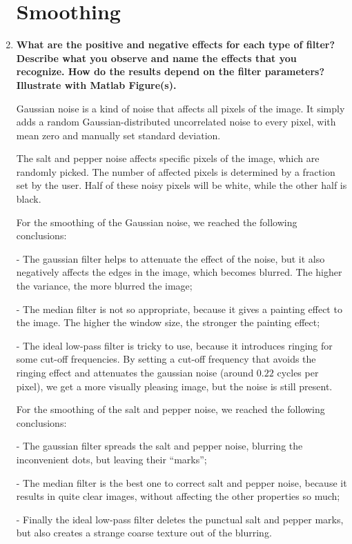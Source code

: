 \documentclass{article}
\begin{document}
\begin{enumerate}
\section{Smoothing}

\item \textbf{What are the positive and negative effects for each type of filter? Describe what you observe and name the effects that you recognize. How do the results depend on the filter parameters? Illustrate with Matlab Figure(s).}

Gaussian noise is a kind of noise that affects all pixels of the image. It simply adds a random Gaussian-distributed uncorrelated noise to every pixel, with mean zero and manually set standard deviation.

The salt and pepper noise affects specific pixels of the image, which are randomly picked. The number of affected pixels is determined by a fraction set by the user. Half of these noisy pixels will be white, while the other half is black.

For the smoothing of the Gaussian noise, we reached the following conclusions:

- The gaussian filter helps to attenuate the effect of the noise, but it also negatively affects the edges in the image, which becomes blurred. The higher the variance, the more blurred the image;

- The median filter is not so appropriate, because it gives a painting effect to the image. The higher the window size, the stronger the painting effect;

- The ideal low-pass filter is tricky to use, because it introduces ringing for some cut-off frequencies. By setting a cut-off frequency that avoids the ringing effect and attenuates the gaussian noise (around $0.22$ cycles per pixel), we get a more visually pleasing image, but the noise is still present.

For the smoothing of the salt and pepper noise, we reached the following conclusions:

- The gaussian filter spreads the salt and pepper noise, blurring the inconvenient dots, but leaving their ``marks'';

- The median filter is the best one to correct salt and pepper noise, because it results in quite clear images, without affecting the other properties so much;

- Finally the ideal low-pass filter deletes the punctual salt and pepper marks, but also creates a strange coarse texture out of the blurring.


\end{enumerate}
\end{document}
